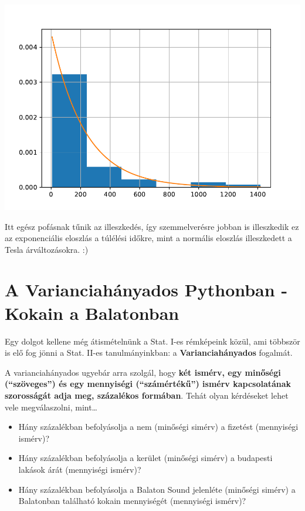 \documentclass[
]{book}
\providecommand{\tightlist}{%
  \setlength{\itemsep}{0pt}\setlength{\parskip}{0pt}}
\begin{document}
\includegraphics{_main_files/figure-latex/unnamed-chunk-189-1.pdf}

Itt egész pofásnak tűnik az illeszkedés, így szemmelverésre jobban is illeszkedik ez az exponenciális eloszlás a túlélési időkre, mint a normális eloszlás illeszkedett a Tesla árváltozásokra. :)

\section{A Varianciahányados Pythonban - Kokain a Balatonban}\label{a-varianciahuxe1nyados-pythonban---kokain-a-balatonban}

Egy dolgot kellene még átismételnünk a Stat. I-es rémképeink közül, ami többször is elő fog jönni a Stat. II-es tanulmányinkban: a \textbf{Varianciahányados} fogalmát.

A varianciahányados ugyebár arra szolgál, hogy \textbf{két ismérv, egy minőségi (``szöveges'') és egy mennyiségi (``számértékű'') ismérv kapcsolatának szorosságát adja meg, százalékos formában}. Tehát olyan kérdéseket lehet vele megválaszolni, mint\ldots{}

\begin{itemize}
\tightlist
\item
  Hány százalékban befolyásolja a nem (minőségi simérv) a fizetést (mennyiségi ismérv)?
\item
  Hány százalékban befolyásolja a kerület (minőségi simérv) a budapesti lakások árát (mennyiségi ismérv)?
\item
  Hány százalékban befolyásolja a Balaton Sound jelenléte (minőségi simérv) a Balatonban található kokain mennyiségét (mennyiségi ismérv)?
\end{itemize}
\end{document}
